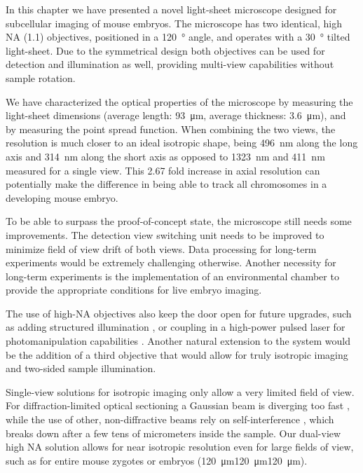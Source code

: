   In this chapter we have presented a novel light-sheet microscope designed for subcellular imaging of mouse embryos. The microscope has two identical, high NA (1.1) objectives, positioned in a \SI{120}{\degree} angle, and operates with a \SI{30}{\degree} tilted light-sheet. Due to the symmetrical design both objectives can be used for detection and illumination as well, providing multi-view capabilities without sample rotation.

  We have characterized the optical properties of the microscope by measuring the light-sheet dimensions (average length: \SI{93}{\micro m}, average thickness: \SI{3.6}{\micro m}), and by measuring the point spread function. When combining the two views, the resolution is much closer to an ideal isotropic shape, being \SI{496}{nm} along the long axis and \SI{314}{nm} along the short axis as opposed to \SI{1323}{nm} and \SI{411}{nm} measured for a single view. This 2.67 fold increase in axial resolution can potentially make the difference in being able to track all chromosomes in a developing mouse embryo.

  To be able to surpass the proof-of-concept state, the microscope still needs some improvements. The detection view switching unit needs to be improved to minimize field of view drift of both views. Data processing for long-term experiments would be extremely challenging otherwise. Another necessity for long-term experiments is the implementation of an environmental chamber to provide the appropriate conditions for live embryo imaging.

  The use of high-NA objectives also keep the door open for future upgrades, such as adding structured illumination \cite{keller_fast_2010, chang_csilsfm_2017}, or coupling in a high-power pulsed laser for photomanipulation capabilities \cite{rauzi_probing_2017}. Another natural extension to the system would be the addition of a third objective that would allow for truly isotropic imaging and two-sided sample illumination.


  Single-view solutions for isotropic imaging only allow a very limited field of view. For diffraction-limited optical sectioning a Gaussian beam is diverging too fast \cite{dean_diagonally_2016}, while the use of other, non-diffractive beams rely on self-interference \cite{chen_lattice_2014}, which breaks down after a few tens of micrometers inside the sample. Our dual-view high NA solution allows for near isotropic resolution even for large fields of view, such as for entire mouse zygotes or embryos (\SI{120}{\micro m}\texttimes\SI{120}{\micro m}\texttimes\SI{120}{\micro m}).
  